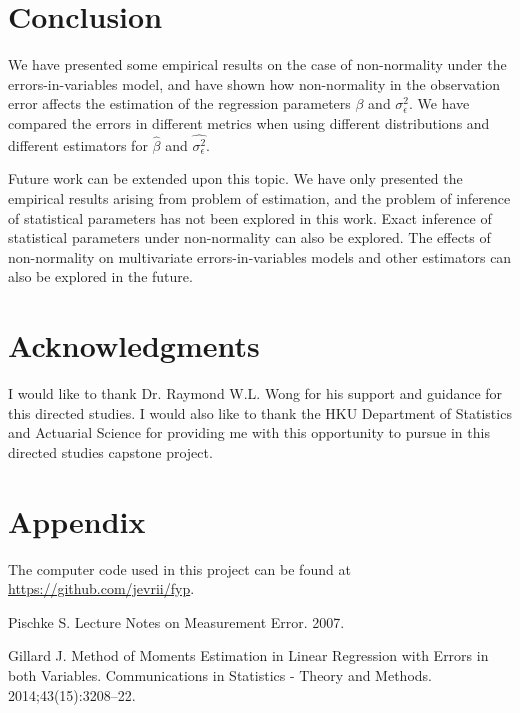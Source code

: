 \documentclass{article}
\begin{document}
\section{Conclusion}

We have presented some empirical results on the case of non-normality under the errors-in-variables model,
and have shown how non-normality in the observation error affects the estimation of the regression parameters $\beta$ and $\sigma^2_\epsilon$. 
We have compared the errors in different metrics when using different distributions and different estimators for $\hat{\beta}$ and $\hat{\sigma^2_\epsilon}$.

Future work can be extended upon this topic.
We have only presented the empirical results arising from problem of estimation,
and the problem of inference of statistical parameters has not been explored in this work.
Exact inference of statistical parameters under non-normality can also be explored.
The effects of non-normality on multivariate errors-in-variables models and other estimators can also be explored in the future.

\section{Acknowledgments}

I would like to thank Dr. Raymond W.L. Wong for his support and guidance for this directed studies.
I would also like to thank the HKU Department of Statistics and Actuarial Science for providing me with this opportunity to pursue in this directed studies capstone project.

\section{Appendix}

The computer code used in this project can be found at \url{https://github.com/jevrii/fyp}.



\begin{thebibliography}{9}

    Pischke S. Lecture Notes on Measurement Error. 2007.

    Gillard J. Method of Moments Estimation in Linear Regression with Errors in both Variables. Communications in Statistics - Theory and Methods. 2014;43(15):3208–22.
\end{thebibliography}
\end{document}
